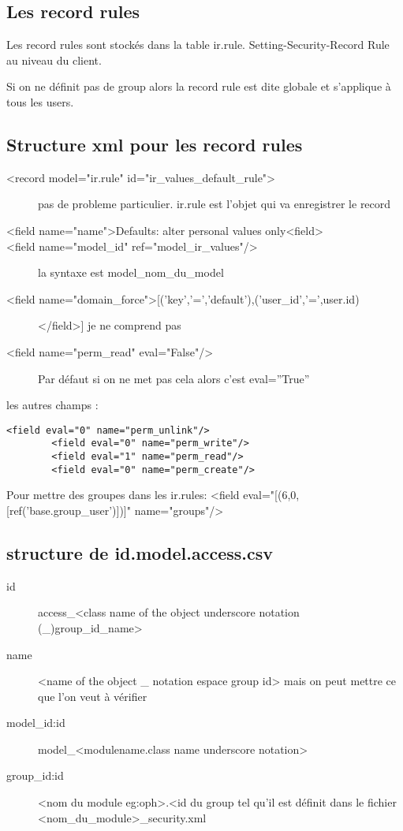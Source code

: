 \documentclass[12pt,a4paper]{article}
\begin{document}
\subsection{Les record rules}
\label{sec:record_rule}

Les record rules sont stockés dans la table ir.rule. 
Setting-Security-Record Rule au niveau du client.

Si on ne définit pas de group alors la record rule est dite globale et s'applique à tous les users.

\subsection{Structure xml pour les record rules}
\label{sec:record_rules}
\begin{description}
  \item[<record model="ir.rule" id="ir\_values\_default\_rule">]  pas de probleme particulier. ir.rule est l'objet qui va enregistrer le record
\item[<field name="name">Defaults: alter personal values only<\/field>]
  \item[<field name="model\_id" ref="model\_ir\_values"/>]  la syntaxe est model\_nom\_du\_model
\item[<field name="domain\_force">[('key','=','default'),('user\_id','=',user.id)]</field>] je ne comprend pas
  \item[<field name="perm\_read" eval="False"/>] Par défaut si on ne met pas cela alors c'est eval=''True''
\end{description}

les autres champs :

\begin{verbatim}
<field eval="0" name="perm_unlink"/>
        <field eval="0" name="perm_write"/>
        <field eval="1" name="perm_read"/>
        <field eval="0" name="perm_create"/>
\end{verbatim}           

Pour mettre des groupes dans les ir.rules:
<field eval="[(6,0,[ref('base.group\_user')])]" name="groups"/>
             
\subsection{structure de id.model.access.csv}
\label{sec:struct_csv}

\begin{description}
\item[id] access\_<class name of the object underscore notation (\_)group\_id\_name>
\item[name] <name of the object \_ notation espace group id> mais on peut mettre ce que l'on veut à vérifier
\item[model\_id:id] model\_<modulename.class name underscore notation> 
\item[group\_id:id] <nom du module eg:oph>.<id du group tel qu'il est définit dans le fichier <nom\_du\_module>\_security.xml
\end{description}
\end{document}
